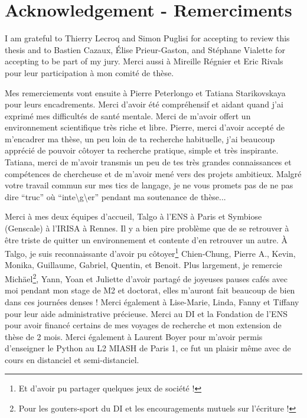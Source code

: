\chapter*{Acknowledgement - Remerciments}
\thispagestyle{empty}

I am grateful to Thierry Lecroq and Simon Puglisi for accepting to review this thesis and to Bastien Cazaux, Élise Prieur-Gaston, and Stéphane Vialette for accepting to be part of my jury. Merci aussi à Mireille Régnier et Eric Rivals pour leur participation à mon comité de thèse.


Mes remerciements vont ensuite à Pierre Peterlongo et Tatiana Starikovskaya pour leurs encadrements. Merci d’avoir été compréhensif et aidant quand j’ai exprimé mes difficultés de santé mentale. Merci de m’avoir offert un environnement scientifique très riche et libre.
Pierre, merci d’avoir accepté de m’encadrer ma thèse, un peu loin de ta recherche habituelle, j’ai beaucoup apprécié de pouvoir côtoyer ta recherche pratique, simple et très inspirante.
Tatiana, merci de m’avoir transmis un peu de tes très grandes connaissances et compétences de chercheuse et de m’avoir mené vers des projets ambitieux.
Malgré votre travail commun sur mes tics de langage, je ne vous promets pas de ne pas dire ``truc'' où ``inte\textbackslash g\textbackslash er'' pendant ma soutenance de thèse...


Merci à mes deux équipes d’accueil, Talgo à l’ENS à Paris et Symbiose (Genscale) à l’IRISA à Rennes. Il y a bien pire problème que de se retrouver à être triste de quitter un environnement et contente d’en retrouver un autre.
À Talgo, je suis reconnaissante d’avoir pu côtoyer\footnote{Et d'avoir pu partager quelques jeux de société !} Chien-Chung, Pierre A., Kevin, Monika, Guillaume, Gabriel, Quentin, et Benoit.
Plus largement, je remercie Michäel\footnote{Pour les gouters-sport du DI et les encouragements mutuels sur l'écriture !}, Yann, Yoan et Juliette d’avoir partagé de joyeuses pauses cafés avec moi pendant mon stage de M2 et doctorat, elles m’auront fait beaucoup de bien dans ces journées denses !
Merci également à Lise-Marie, Linda, Fanny et Tiffany pour leur aide administrative précieuse. Merci au DI et la Fondation de l’ENS pour avoir financé certains de mes voyages de recherche et mon extension de thèse de 2 mois.
Merci également à Laurent Boyer pour m’avoir permis d’enseigner le Python au L2 MIASH de Paris 1, ce fut un plaisir même avec de cours en distanciel et semi-distanciel.


